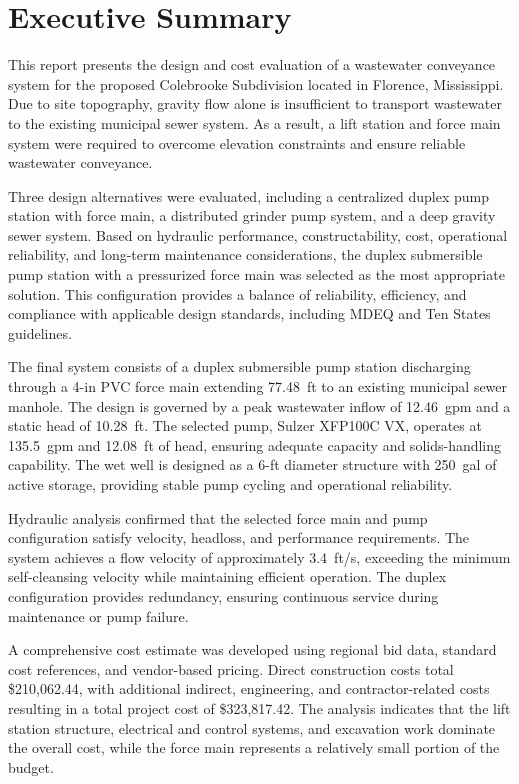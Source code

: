 \documentclass[letterpaper,12pt]{report} %
\begin{document}


\chapter*{Executive Summary}

This report presents the design and cost evaluation of a wastewater conveyance system for the proposed Colebrooke Subdivision located in Florence, Mississippi. Due to site topography, gravity flow alone is insufficient to transport wastewater to the existing municipal sewer system. As a result, a lift station and force main system were required to overcome elevation constraints and ensure reliable wastewater conveyance.

Three design alternatives were evaluated, including a centralized duplex pump station with force main, a distributed grinder pump system, and a deep gravity sewer system. Based on hydraulic performance, constructability, cost, operational reliability, and long-term maintenance considerations, the duplex submersible pump station with a pressurized force main was selected as the most appropriate solution. This configuration provides a balance of reliability, efficiency, and compliance with applicable design standards, including MDEQ and Ten States guidelines.

The final system consists of a duplex submersible pump station discharging through a 4-in PVC force main extending 77.48~ft to an existing municipal sewer manhole. The design is governed by a peak wastewater inflow of 12.46~gpm and a static head of 10.28~ft. The selected pump, Sulzer XFP100C VX, operates at 135.5~gpm and 12.08~ft of head, ensuring adequate capacity and solids-handling capability. The wet well is designed as a 6-ft diameter structure with 250~gal of active storage, providing stable pump cycling and operational reliability.

Hydraulic analysis confirmed that the selected force main and pump configuration satisfy velocity, headloss, and performance requirements. The system achieves a flow velocity of approximately 3.4~ft/s, exceeding the minimum self-cleansing velocity while maintaining efficient operation. The duplex configuration provides redundancy, ensuring continuous service during maintenance or pump failure.

A comprehensive cost estimate was developed using regional bid data, standard cost references, and vendor-based pricing. Direct construction costs total \$210{,}062.44, with additional indirect, engineering, and contractor-related costs resulting in a total project cost of \$323{,}817.42. The analysis indicates that the lift station structure, electrical and control systems, and excavation work dominate the overall cost, while the force main represents a relatively small portion of the budget.
\end{document}
